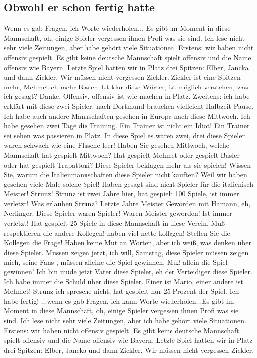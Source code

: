 \subsection{Obwohl er schon fertig hatte}
Wenn es gab Fragen, ich Worte wiederholen... Es gibt im Moment in diese Mannschaft, oh, einige Spieler vergessen ihnen Profi was sie sind. Ich lese nicht sehr viele Zeitungen, aber habe gehört viele Situationen. Erstens: wir haben nicht offensiv gespielt. Es gibt keine deutsche Mannschaft spielt offensiv und die Name offensiv wie Bayern. Letzte Spiel hatten wir in Platz drei Spitzen: Elber, Jancka und dann Zickler. Wir müssen nicht vergessen Zickler. Zickler ist eine Spitzen mehr, Mehmet eh mehr Basler. Ist klar diese Wörter, ist möglich verstehen, was ich gesagt? Danke. Offensiv, offensiv ist wie machen in Platz. Zweitens: ich habe erklärt mit diese zwei Spieler: nach Dortmund brauchen vielleicht Halbzeit Pause. Ich habe auch andere Mannschaften gesehen in Europa nach diese Mittwoch. Ich habe gesehen zwei Tage die Training. Ein Trainer ist nicht ein Idiot! Ein Trainer sei sehen was passieren in Platz. In diese Spiel es waren zwei, drei diese Spieler waren schwach wie eine Flasche leer! Haben Sie gesehen Mittwoch, welche Mannschaft hat gespielt Mittwoch? Hat gespielt Mehmet oder gespielt Basler oder hat gespielt Trapattoni? Diese Spieler beklagen mehr als sie spielen! Wissen Sie, warum die Italienmannschaften diese Spieler nicht kauften? Weil wir haben gesehen viele Male solche Spiel! Haben gesagt sind nicht Spieler für die italienisch Meister! Strunz! Strunz ist zwei Jahre hier, hat gespielt 100 Spiele, ist immer verletzt! Was erlauben Strunz? Letzte Jahre Meister Geworden mit Hamann, eh, Nerlinger. Diese Spieler waren Spieler! Waren Meister geworden! Ist immer verletzt! Hat gespielt 25 Spiele in diese Mannschaft in diese Verein. Muß respektieren die andere Kollegen! haben viel nette kollegen! Stellen Sie die Kollegen die Frage! Haben keine Mut an Worten, aber ich weiß, was denken über diese Spieler. Mussen zeigen jetzt, ich will, Samstag, diese Spieler müssen zeigen mich, seine Fans , müssen alleine die Spiel gewinnen. Muß allein die Spiel gewinnen! Ich bin müde jetzt Vater diese Spieler, eh der Verteidiger diese Spieler. Ich habe immer die Schuld über diese Spieler. Einer ist Mario, einer andere ist Mehmet! Strunz ich spresche nicht, hat gespielt nur 25 Prozent der Spiel. Ich habe fertig! ...wenn es gab Fragen, ich kann Worte wiederholen...Es gibt im Moment in diese Mannschaft, oh, einige Spieler vergessen ihnen Profi was sie sind. Ich lese nicht sehr viele Zeitungen, aber ich habe gehört viele Situationen. Erstens: wir haben nicht offensiv gespielt. Es gibt keine deutsche Mannschaft spielt offensiv und die Name offensiv wie Bayern. Letzte Spiel hatten wir in Platz drei Spitzen: Elber, Jancka und dann Zickler. Wir müssen nicht vergessen Zickler.
